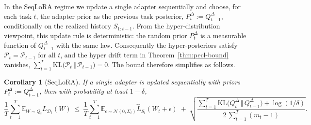 \documentclass[10pt]{article} %
\newtheorem{corollary}{Corollary}
\begin{document}



In the SeqLoRA regime we update a single adapter sequentially and choose, for each task $t$, the adapter prior as the previous task posterior,
$
P_t^{\Delta} := Q_{t-1}^{\Delta}
$,
conditionally on the realized history $S_{1:t-1}$. From the hyper-distribution viewpoint, this update rule is deterministic: the random prior $P_t^{\Delta}$ is a measurable function of $Q_{t-1}^{\Delta}$ with the same law. Consequently the hyper-posteriors satisfy
$
\mathcal{P}_t = \mathcal{P}_{t-1}
$
for all $t$, and the hyper drift term in Theorem~\ref{thm:pecl-bound} vanishes,
$
\sum_{t=1}^{T} \mathrm{KL}\bigl(\mathcal{P}_t \,\Vert\, \mathcal{P}_{t-1}\bigr) = 0.
$
The bound therefore simplifies as follows.

\begin{corollary}[SeqLoRA]\label{cor:seq-lora}
If a single adapter is updated sequentially with priors $P_t^{\Delta} := Q_{t-1}^{\Delta}$, then with probability at least $1-\delta$,
\[
\frac1T\sum_{t=1}^T \mathbb{E}_{W\sim Q_t} L_{\mathcal{D}_t}(W)
\ \le\
\frac1T\sum_{t=1}^T \mathbb{E}_{\epsilon \sim \mathcal{N}(0,\Sigma_t)} \widehat L_{S_t}(W_t + \epsilon)
\;+\;
\sqrt{\frac{
\sum_{t=1}^T \mathrm{KL}\bigl(Q_t^{\Delta}\,\Vert\,Q_{t-1}^{\Delta}\bigr)
+\log(1/\delta)}
{2\,\sum_{t=1}^T (m_t-1)}}.
\]
\end{corollary}
\end{document}
